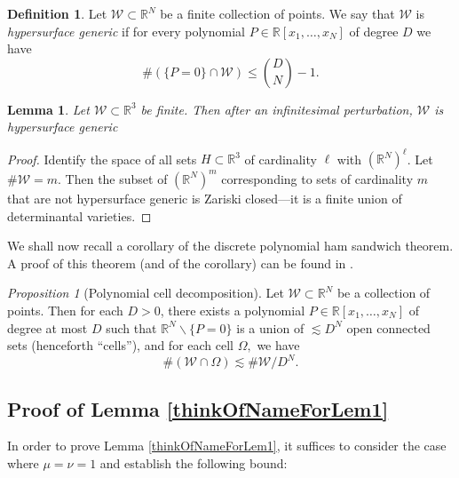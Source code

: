 \documentclass[reqno]{amsart}
\newtheorem{lem}[thm]{Lemma}
\theoremstyle{definition}
\newtheorem{defn}[thm]{Definition}
\theoremstyle{remark}
\newtheorem{prop}[thm]{Proposition}
\theoremstyle{remark}
\newcommand{\RR}{\mathbb{R}}
\newcommand{\WC}{\mathcal W}
\begin{document}
\begin{defn}
 Let $\WC\subset\RR^N$ be a finite collection of points. We say that $\WC$ is \emph{hypersurface generic} if for every polynomial $P\in\RR[x_1,\ldots,x_N]$ of degree $D$ we have
\begin{equation*}
 \#(\{P=0\}\cap\WC)\leq\binom{D}{N}-1.
 \end{equation*}
\end{defn}
\begin{lem}
 Let $\WC\subset\RR^3$ be finite. Then after an infinitesimal perturbation, $\WC$ is hypersurface generic
\end{lem}
\begin{proof}
Identify the space of all sets $H\subset\RR^3$ of cardinality $\ell$ with $(\RR^N)^\ell$. Let $\#\WC=m$. Then the subset of $(\RR^N)^{m}$ corresponding to sets of cardinality $m$ that are not hypersurface generic is Zariski closed---it is a finite union of determinantal varieties.
\end{proof}

We shall now recall a corollary of the discrete polynomial ham sandwich theorem. A proof of this theorem (and of the corollary) can be found in \cite[Theorem 4.1]{Guth2}.

\begin{prop}[Polynomial cell decomposition]\label{discPolyHamSandThm}
Let $\mathcal W\subset\RR^N$ be a collection of points. Then for each $D>0$, there exists a polynomial $P\in\RR[x_1,\ldots,x_N]$ of degree at most $D$ such that $\RR^N\backslash\{P=0\}$ is a union of $\lesssim D^N$ open connected sets (henceforth ``cells''), and for each cell $\Omega,$ we have
\begin{equation}
\#(\mathcal W \cap\Omega)\lesssim \#\mathcal W/D^N.
\end{equation}
\end{prop}

%
%
%
\subsection{Proof of Lemma \ref{thinkOfNameForLem1}}
In order to prove Lemma \ref{thinkOfNameForLem1}, it suffices to consider the case where $\mu=\nu=1$ and establish the following bound:
\end{document}
